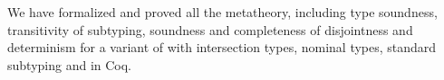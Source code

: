 We have formalized and proved all the metatheory, including
type soundness, transitivity of subtyping, soundness and completeness
of disjointness and determinism for a variant of \name with
intersection types, nominal types, standard subtyping and  in Coq.

\begin{comment}
\subsection{Disjoint Switches in Ceylon}
\label{sec:discussion:ceylon}
\ningning{A similar example is used in the overview. Maybe we want to be
  consistent with the examples.}
\baber{I will make this example consistent with the example in overview. But I suppose
  I should be using Ceylon syntax in this section.}

\begin{figure}[t]
\begin{lstlisting}[language=Scala,xleftmargin=.2\textwidth, xrightmargin=.2\textwidth]
// Student <: Person
// speak function will not type check
void speak(Person | Student val) {
  switch (val)
  case (is Person) {print("person speaks");}
  case (is Student) {print("student speaks");}
}
\end{lstlisting}
\caption{Ceylon disjointness code example.}
\label{discussion:list:ceylon}
\end{figure}

\noindent The function \emph{speak} in \Cref{discussion:list:ceylon}
will not type check in Ceylon. Because \emph{Person} and
\emph{Student} are not disjoint types. \emph{Person} and \emph{Student} both have a common
subtype which is \emph{Student}. \name will also reject such programs.
A difference between the disjointness in Ceylon and \name is that
Ceylon does not provide
a formal disjointness definition.
Ceylon specification does, however, provide English descriptions
for disjointness.
We compare some of those descriptions with
the disjointness in \name. Ceylon has 14 different points describing
disjointness, but some of these are language specific, for instance,
disjointness for some of important classes and primitive types in Ceylon.
We pick 3 points next, copied from the
Ceylon specification\footnote{\url{https://ceylon-lang.org/documentation/1.3/spec/html_single/}}, which are quite general and they can be related to our
own definitions of disjointness.
According to the specification, two types X and Y are disjoint when:

\begin{enumerate}
  \item{X and Y are both classes and X is not a subclass of Y and Y is not a subclass of X}
  \item{X is a union type $[[A \/ B]]$ and both Y and A are disjoint and Y and B are disjoint}
  \item{X is an intersection type $[[A/\B]]$ and either Y and A are disjoint or Y and B are disjoint}
\end{enumerate}


\end{comment}
